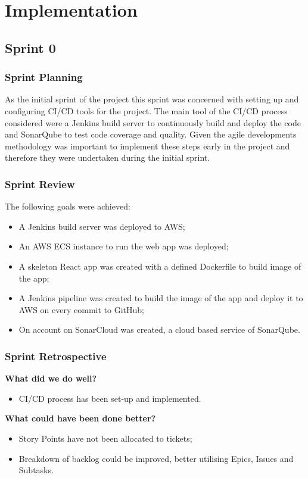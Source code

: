 \section{Implementation}
	\subsection{Sprint 0}
		\subsubsection{Sprint Planning}
		As the initial sprint of the project this sprint was concerned with setting up and configuring CI/CD tools for the project. The main tool of the CI/CD process considered were a Jenkins build server to continuously build and deploy the code and SonarQube to test code coverage and quality. Given the agile developments methodology was important to implement these steps early in the project and therefore they were undertaken during the initial sprint.

		\subsubsection{Sprint Review}
		The following goals were achieved:
		\begin{itemize}
			\item A Jenkins build server was deployed to AWS;
			\item An AWS ECS instance to run the web app was deployed;
			\item A skeleton React app was created with a defined Dockerfile to build image of the app;
			\item A Jenkins pipeline was created to build the image of the app and deploy it to AWS on every commit to GitHub;
			\item On account on SonarCloud was created, a cloud based service of SonarQube. 
		\end{itemize}
		
		\subsubsection{Sprint Retrospective}
		\textbf{What did we do well?}
		\begin{itemize}	
			\item CI/CD process has been set-up and implemented.
		\end{itemize}
		
		\noindent\textbf{What could have been done better?}
		\begin{itemize}
			\item Story Points have not been allocated to tickets;
			\item Breakdown of backlog could be improved, better utilising Epics, Issues and Subtasks.
		\end{itemize}
		
